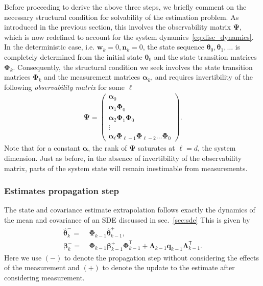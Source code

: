 \documentclass{resonance}
\def\th{\bm{\theta}}
\def\thh{\bm{\hat{\theta}}}
\def\n{\bm{n}}
\def\w{\mathbf{w}}
\def\q{\mathbf{q}}
\def\p{\bm{\beta}}
\def\T{\mathsf{T}}
\def\H{\bm{\alpha}}
\def\PhiB{\boldsymbol{\Phi}}
\def\LambdaB{\boldsymbol{\Lambda}}
\begin{document}
Before proceeding to derive the above three steps, we
briefly comment on the necessary structural condition for solvability of the estimation problem. 
As introduced in the previous section, this 
involves the observability matrix $\mathbf{\Psi}$,
which is now redefined to account for the system
dynamics~\eqref{eq:disc_dynamics}. In the deterministic case, i.e. $\w_k = 0, \n_k = 0$, the state sequence $\th_0, \th_1, \ldots$ is completely determined from the initial state $\th_0$ and the state transition matrices $\PhiB_k$. Consequently, the structural condition we seek involves the
state transition matrices $\PhiB_k$ and the measurement matrices $\H_k$, and requires invertibility of the 
following \textit{observability matrix} for some $\ell$
\begin{align*}
    \mathbf{\Psi} = \left( \begin{matrix} \H_0 \\ \H_1 \PhiB_{0} \\  \H_2 \PhiB_{1} \PhiB_{0} \\ \vdots \\ \H_{\ell} \PhiB_{\ell -1} \PhiB_{\ell -2} \ldots  \PhiB_0 \end{matrix} \right).
\end{align*}
Note that for a constant $\H$, the rank of $\mathbf{\Psi}$ saturates at $\ell=d$, the system dimension. Just as before, in the absence of invertibility of the observability matrix, parts of the system state will remain inestimable
from measurements.

\subsubsection*{Estimates propagation step}
The state and covariance estimate extrapolation follows exactly the dynamics of the mean and covariance of an SDE discussed in sec.~\ref{sec:sde} This is given by
\begin{align}
\thh_k^{-} =& \ \PhiB_{k-1} \thh_{k-1}^{+}, \\
\p_k^{-} =& \ \PhiB_{k-1} \p_{k-1}^{+} \PhiB_{k-1}^\T + \LambdaB_{k-1}\q_{k-1}\LambdaB^\T_{k-1}.
\end{align}
Here we use $(-)$ to denote the propagation step without considering the effects of the measurement and $(+)$ to denote the update to the estimate after considering measurement.
\end{document}
